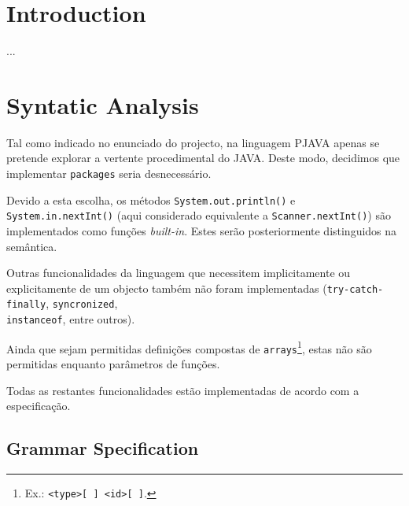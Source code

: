 \documentclass[a4paper]{article}
\title{\documentTitle}
\author{\documentAuthors{}}
\begin{document}
\renewcommand{\figurename}{Figure}
\renewcommand{\contentsname}{Contents}

\maketitle
\cleardoublepage

\tableofcontents
\cleardoublepage

\setlength{\parindent}{1cm}
\setlength{\parskip}{0.3cm}

\section{Introduction}
\indent \indent ...

\cleardoublepage

\section{Syntatic Analysis} %
\indent \indent Tal como indicado no enunciado do projecto, na linguagem PJAVA apenas se pretende explorar a vertente procedimental do JAVA. 
Deste modo, decidimos que implementar \texttt{packages} seria desnecessário.

\indent Devido a esta escolha, os métodos \texttt{System.out.println()} e \texttt{System.in.nextInt()} (aqui considerado equivalente a \texttt{Scanner.nextInt()})
são implementados como funções \emph{built-in}. Estes serão posteriormente distinguidos na semântica.

Outras funcionalidades da linguagem que necessitem implicitamente ou explicitamente de um objecto também não foram implementadas (\texttt{try-catch-finally}, \texttt{syncronized}, \\ \texttt{instanceof}, entre outros).

Ainda que sejam permitidas definições compostas de \texttt{arrays}\footnote[1]{Ex.: \texttt{<type>[ ] <id>[ ]}.}, estas não são permitidas enquanto parâmetros de funções.

Todas as restantes funcionalidades estão implementadas de acordo com a especificação.

\cleardoublepage

\subsection{Grammar Specification}


\cleardoublepage
\end{document}
